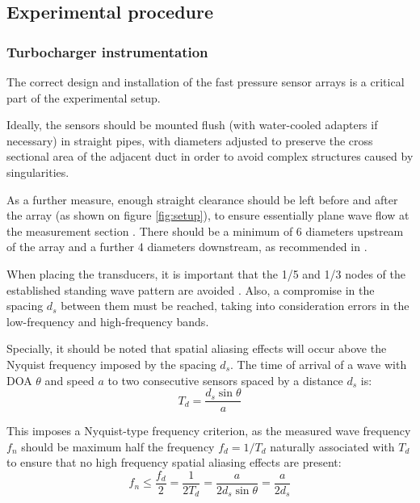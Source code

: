 \subsection{Experimental procedure}
\label{sec:experimental_procedure}

\subsubsection{Turbocharger instrumentation}
\label{sub:turbocharger_instrumentation}

The correct design and installation of the fast pressure sensor arrays
is a critical part of the experimental setup.

Ideally, the sensors should be mounted flush (with water-cooled adapters if necessary) in straight pipes, with diameters adjusted to preserve the cross sectional area of the adjacent duct in order to avoid complex structures caused by singularities.

As a further measure, enough straight clearance should be left before and after the array (as shown on figure \ref{fig:setup}), to ensure essentially plane wave flow at the measurement section \cite{holland2000measurement}. There should be a minimum of 6 diameters upstream of the array and a further 4 diameters downstream, as recommended in \cite{torregrosa2005exp}.

When placing the transducers, it is important that the 1/5 and 1/3 nodes of the established standing wave pattern are avoided \cite{dowling1983sound}. Also, a compromise in the spacing $d_s$ between them must be reached, taking into consideration errors in the  low-frequency \cite{aabom1988error} and high-frequency \cite{seybert1988two} bands.

Specially, it should be noted that spatial aliasing effects will occur above the Nyquist frequency imposed by the spacing $d_s$. The time of arrival of a wave with DOA $\theta$ and speed $a$ to two consecutive sensors spaced by a distance $d_s$ is:
\begin{equation}
  T_d = \frac{d_s \sin \theta}{a}
\end{equation}

This imposes a Nyquist-type frequency criterion, as the measured wave frequency $f_n$ should be maximum half the frequency $f_d=1/T_d$ naturally associated with $T_d$ to ensure that no high frequency spatial aliasing effects are present:
\begin{equation}\label{eq:f_nyquist}
  f_n \leq \frac{f_d}{2} = \frac{1}{2T_d}=\frac{a}{2d_s \sin \theta}=\frac{a}{2d_s}
\end{equation}

